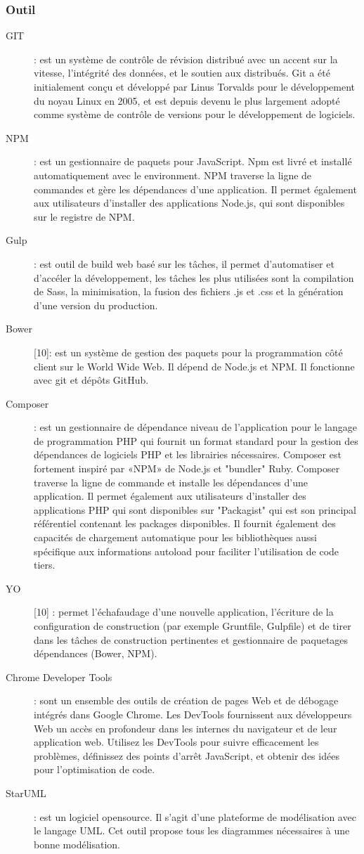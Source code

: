 \documentclass[12pt, ChapStyle1, oneside]{./Styles/Dea_Gsm}
\begin{document}
\subsubsection{Outil}
\begin{description}
\item[GIT] : est un système de contrôle de révision distribué avec un accent sur la vitesse, l'intégrité des données, et le soutien aux distribués. Git a été initialement conçu et développé par Linus Torvalds pour le développement du noyau Linux en 2005, et est depuis devenu le plus largement adopté comme système de contrôle de versions pour le développement de logiciels.
\item[NPM] : est un gestionnaire de paquets pour JavaScript. Npm est livré et installé automatiquement avec le environment. NPM traverse la ligne de commandes et gère les dépendances d'une application. Il permet également aux utilisateurs d'installer des applications Node.js, qui sont disponibles sur le registre de NPM.
\item[Gulp] : est outil de build web basé sur les tâches, il permet d'automatiser et d'accéler la développement, les tâches les plus utilisées sont la compilation de Sass, la minimisation, la fusion des fichiers .js et .css et la génération d’une version du production.
\item[Bower] [10]:  est un système de gestion des paquets pour la programmation côté client sur le World Wide Web. Il dépend de Node.js et NPM. Il fonctionne avec git et dépôts GitHub.
\item[Composer] : est un gestionnaire de dépendance niveau de l'application pour le langage de programmation PHP qui fournit un format standard pour la gestion des dépendances de logiciels PHP et les librairies nécessaires. Composer est fortement inspiré par «NPM» de Node.js et "bundler" Ruby. 
Composer traverse la ligne de commande et installe les dépendances d'une application. Il permet également aux utilisateurs d'installer des applications PHP qui sont disponibles sur "Packagist" qui est son principal référentiel contenant les packages disponibles. Il fournit également des capacités de chargement automatique pour les bibliothèques aussi spécifique aux informations autoload pour faciliter l'utilisation de code tiers.
\item[YO] [10] : permet l'échafaudage d'une nouvelle application, l'écriture de la configuration de construction (par exemple Gruntfile, Gulpfile) et de tirer dans les tâches de construction pertinentes et gestionnaire de paquetages dépendances (Bower, NPM).
\item[Chrome Developer Tools] : sont un ensemble des outils de création de pages Web et de débogage intégrés dans Google Chrome. Les DevTools fournissent aux développeurs Web un accès en profondeur dans les internes du navigateur et de leur application web. Utilisez les DevTools pour suivre efficacement les problèmes, définissez des points d'arrêt JavaScript, et obtenir des idées pour l'optimisation de code.
\item[StarUML] : est un logiciel opensource. Il s'agit d'une plateforme de modélisation avec le langage UML. Cet outil propose tous les diagrammes nécessaires à une bonne modélisation.
\end{description}
\end{document}
